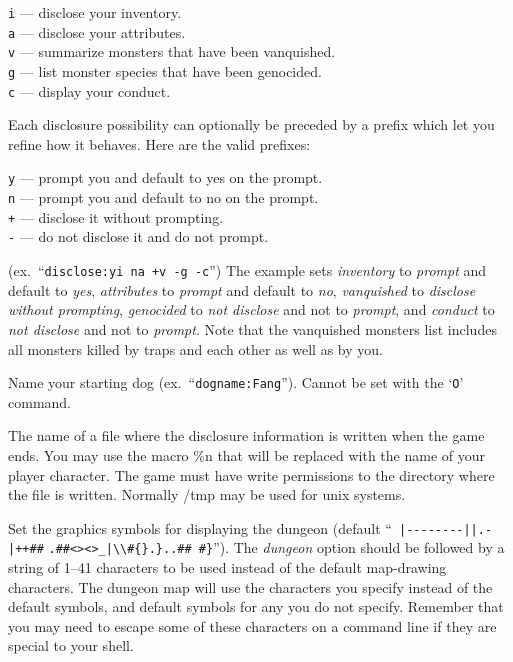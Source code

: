 {\tt i} --- disclose your inventory.\\
{\tt a} --- disclose your attributes.\\
{\tt v} --- summarize monsters that have been vanquished.\\
{\tt g} --- list monster species that have been genocided.\\
{\tt c} --- display your conduct.

Each disclosure possibility can optionally be preceded by a prefix which
let you refine how it behaves. Here are the valid prefixes:

{\tt y} --- prompt you and default to yes on the prompt.\\
{\tt n} --- prompt you and default to no on the prompt.\\
{\tt +} --- disclose it without prompting.\\
{\tt -} --- do not disclose it and do not prompt.

(ex.\ ``{\tt disclose:yi na +v -g -c}'')
The example sets {\it inventory\/} to {\it prompt\/} and default to {\it yes\/}, 
{\it attributes\/} to {\it prompt\/} and default to {\it no\/}, 
{\it vanquished\/} to {\it disclose without prompting\/}, 
{\it genocided\/} to {\it not disclose\/} and not to {\it prompt\/}, and 
{\it conduct\/} to {\it not disclose\/} and not to {\it prompt\/}.
Note that the vanquished monsters list includes all monsters killed by
traps and each other as well as by you. 
\item[\ib{dogname}]
Name your starting dog (ex.\ ``{\tt dogname:Fang}'').
Cannot be set with the `{\tt O}' command.
\item[\ib{dumpfile}]
The name of a file where the disclosure information is written when the
game ends. You may use the macro \%n that will be replaced with the name
of your player character. The game must have write permissions to the
directory where the file is written. Normally /tmp may be used for unix
systems.
\item[\ib{dungeon}]
Set the graphics symbols for displaying the dungeon (default
``\verb& |--------||.-|++##& \verb&.##<><>_|\\#{}.}..## #}&'').
The {\it dungeon\/} option should be
followed by a string of 1--41
characters to be used instead of the default map-drawing characters.
The dungeon map will use the characters you specify instead of the
default symbols, and default symbols for any you do not specify.
Remember that you may need to escape some of these characters
on a command line if they are special to your shell.

